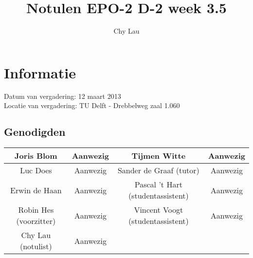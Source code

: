 \documentclass{article}
\begin{document}
\title{Notulen EPO-2 D-2 week 3.5}%
\author{Chy Lau}%
\maketitle

\section*{Informatie}
Datum van vergadering: 12 maart 2013\\ %
Locatie van vergadering: TU Delft - Drebbelweg zaal 1.060 %
\subsection*{Genodigden}
\begin{center}
\begin{tabular}{|c |c |c |c |}
	\hline
	Joris Blom & Aanwezig & Tijmen Witte & Aanwezig \\
	\hline
	Luc Does & Aanwezig & Sander de Graaf (tutor) & Aanwezig \\
	\hline
	Erwin de Haan & Aanwezig & Pascal 't Hart (studentassistent) & Aanwezig \\
	\hline
	Robin Hes (voorzitter) & Aanwezig & Vincent Voogt (studentassistent) & Aanwezig \\
	\hline
	Chy Lau (notulist) & Aanwezig & & \\
	\hline
\end{tabular}
\end{center}
\end{document}
